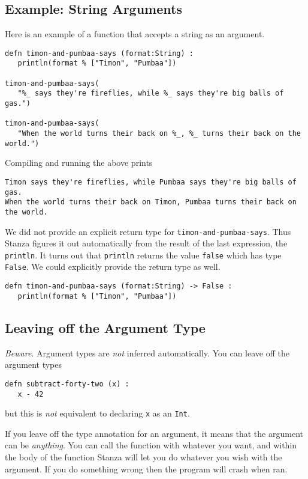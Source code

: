 \documentclass[10pt,oneside]{book}
\begin{document}
\subsection*{Example: String Arguments}
Here is an example of a function that accepts a string as an argument.
\begin{lstlisting}
defn timon-and-pumbaa-says (format:String) :
   println(format % ["Timon", "Pumbaa"])

timon-and-pumbaa-says(
   "%_ says they're fireflies, while %_ says they're big balls of gas.")
   
timon-and-pumbaa-says(
   "When the world turns their back on %_, %_ turns their back on the world.")
\end{lstlisting}
Compiling and running the above prints
\begin{lstlisting}
Timon says they're fireflies, while Pumbaa says they're big balls of gas.
When the world turns their back on Timon, Pumbaa turns their back on the world.
\end{lstlisting}

We did not provide an explicit return type for \texttt{\frenchspacing timon-and-pumbaa-says}. Thus Stanza figures it out automatically from the result of the last expression, the \texttt{\frenchspacing println}. It turns out that \texttt{\frenchspacing println} returns the value \texttt{\frenchspacing false} which has type \texttt{\frenchspacing False}. We could explicitly provide the return type as well.
\begin{lstlisting}
defn timon-and-pumbaa-says (format:String) -> False :
   println(format % ["Timon", "Pumbaa"])
\end{lstlisting}

\subsection*{Leaving off the Argument Type}
{\em Beware}. Argument types are {\em not} inferred automatically. You can leave off the argument types
\begin{lstlisting}
defn subtract-forty-two (x) :
   x - 42   
\end{lstlisting}
but this is {\em not} equivalent to declaring \texttt{\frenchspacing x} as an \texttt{\frenchspacing Int}.

If you leave off the type annotation for an argument, it means that the argument can be {\em anything}. You can call the function with whatever you want, and within the body of the function Stanza will let you do whatever you wish with the argument. If you do something wrong then the program will crash when ran.
\end{document}
